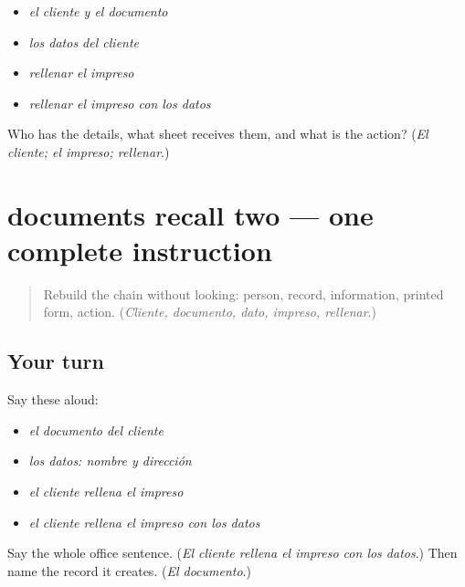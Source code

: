 \begin{itemize}
\raggedright
  \item \emph{el cliente y el documento}
  \item \emph{los datos del cliente}
  \item \emph{rellenar el impreso}
  \item \emph{rellenar el impreso con los datos}
\end{itemize}

\begin{tcolorbox}[breakable,colback=teal!4,colframe=teal!35!black,title={Before you move on}]
Who has the details, what sheet receives them, and what is the action? (\emph{El cliente; el impreso; rellenar}.)
\end{tcolorbox}
\section[(review)]{documents recall two — one complete instruction}

\label{lesson:ES-C406-documents-recall-2}



\begin{quote}
Rebuild the chain without looking: person, record, information, printed form, action. (\emph{Cliente, documento, dato, impreso, rellenar}.)
\end{quote}

\subsection*{Your turn}
Say these aloud:

\begin{itemize}
\raggedright
  \item \emph{el documento del cliente}
  \item \emph{los datos: nombre y dirección}
  \item \emph{el cliente rellena el impreso}
  \item \emph{el cliente rellena el impreso con los datos}
\end{itemize}

\begin{tcolorbox}[breakable,colback=teal!4,colframe=teal!35!black,title={Before you move on}]
Say the whole office sentence. (\emph{El cliente rellena el impreso con los datos}.) Then name the record it creates. (\emph{El documento}.)
\end{tcolorbox}
